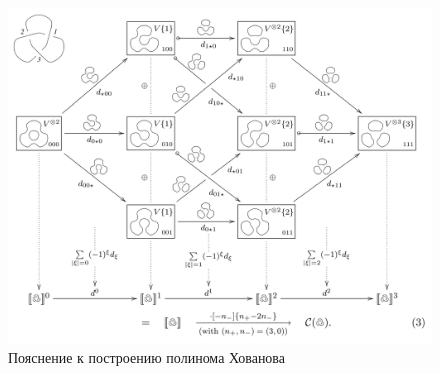 \documentclass[a4paper,8pt]{extarticle}
\begin{document}
\begin{figure}[h]
  \centering
  \includegraphics[width=0.8\linewidth]{../img/bar-natan-2.png}
  \caption{Пояснение к построению полинома Хованова \parencite{bar-natan}}
  \label{fig:bar-natan-2}
\end{figure}

\printbibliography
\end{document}
